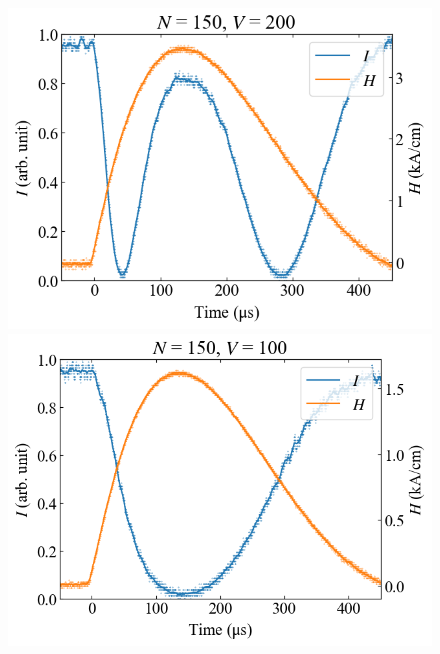 \documentclass[9pt,dvipdfmx,a4paper]{jsarticle}
\begin{document}
\begin{figure}[H]
\begin{minipage}[t]{0.24\columnwidth}
        \includegraphics[width = \columnwidth]{xt/03.png}
    \end{minipage}
    \hfill
    \begin{minipage}[t]{0.24\columnwidth}
        \centering
        \includegraphics[width = \columnwidth]{xt/04.png}
    \end{minipage}
\end{figure}
\end{document}
